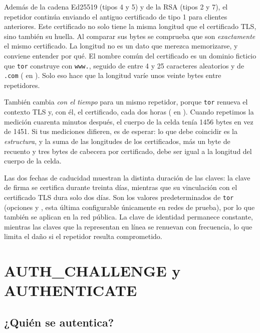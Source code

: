 Además de la cadena Ed25519 (tipos 4 y 5) y de la RSA (tipos 2 y 7), el repetidor continúa enviando el antiguo certificado de tipo 1 para clientes anteriores. Este certificado no solo tiene la misma longitud que el certificado TLS, sino también su huella. Al comparar sus bytes se comprueba que son \emph{exactamente} el mismo certificado. La longitud no es un dato que merezca memorizarse, y conviene entender por qué. El nombre común del certificado es un dominio ficticio que \texttt{tor} construye con \texttt{www.}, seguido de entre 4 y 25 caracteres aleatorios y de \texttt{.com} ( en ). Solo eso hace que la longitud varíe unos veinte bytes entre repetidores.

También cambia \emph{con el tiempo} para un mismo repetidor, porque \texttt{tor} renueva el contexto TLS y, con él, el certificado, cada dos horas ( en ). Cuando repetimos la medición cuarenta minutos después, el cuerpo de la celda  tenía 1456 bytes en vez de 1451. Si tus mediciones difieren, es de esperar: lo que debe coincidir es la \emph{estructura}, y la suma de las longitudes de los certificados, más un byte de recuento y tres bytes de cabecera por certificado, debe ser igual a la longitud del cuerpo de la celda.

Las dos fechas de caducidad muestran la distinta duración de las claves: la clave de firma se certifica durante treinta días, mientras que su vinculación con el certificado TLS dura solo dos días. Son los valores predeterminados de \texttt{tor} (opciones  y , esta última configurable únicamente en redes de prueba), por lo que también se aplican en la red pública. La clave de identidad permanece constante, mientras las claves que la representan en línea se renuevan con frecuencia, lo que limita el daño si el repetidor resulta comprometido.

\section{AUTH\_CHALLENGE y AUTHENTICATE}\label{sec:canale-authenticate}

\subsection{¿Quién se autentica?}

